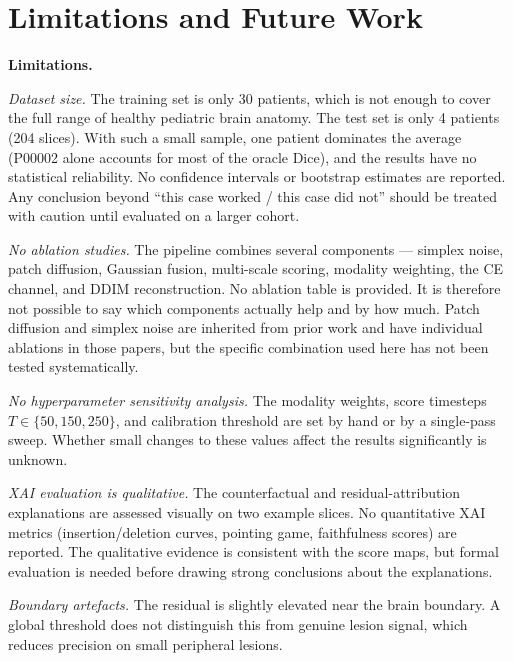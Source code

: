 \documentclass[12pt, a4paper]{article}
\theoremstyle{definition}\newtheorem{definition}{Definition}
\begin{document}
\section{Limitations and Future Work}
\label{sec:future}
\textbf{Limitations.}

\textit{Dataset size.} The training set is only 30 patients, which is not enough to
cover the full range of healthy pediatric brain anatomy. The test set is only 4
patients (204 slices). With such a small sample, one patient dominates the average
(P00002 alone accounts for most of the oracle Dice), and the results have no
statistical reliability. No confidence intervals or bootstrap estimates are reported.
Any conclusion beyond ``this case worked / this case did not'' should be treated with
caution until evaluated on a larger cohort.

\textit{No ablation studies.} The pipeline combines several components --- simplex
noise, patch diffusion, Gaussian fusion, multi-scale scoring, modality weighting, the
CE channel, and DDIM reconstruction. No ablation table is provided. It is therefore
not possible to say which components actually help and by how much. Patch diffusion
and simplex noise are inherited from prior work \cite{behrendt2023,wyatt2022} and
have individual ablations in those papers, but the specific combination used here has
not been tested systematically.

\textit{No hyperparameter sensitivity analysis.} The modality weights, score timesteps
$T\in\{50,150,250\}$, and calibration threshold are set by hand or by a single-pass
sweep. Whether small changes to these values affect the results significantly is
unknown.

\textit{XAI evaluation is qualitative.} The counterfactual and residual-attribution
explanations are assessed visually on two example slices. No quantitative XAI metrics
(insertion/deletion curves, pointing game, faithfulness scores) are reported. The
qualitative evidence is consistent with the score maps, but formal evaluation is
needed before drawing strong conclusions about the explanations.

\textit{Boundary artefacts.} The residual is slightly elevated near the brain
boundary. A global threshold does not distinguish this from genuine lesion signal,
which reduces precision on small peripheral lesions.
\end{document}
